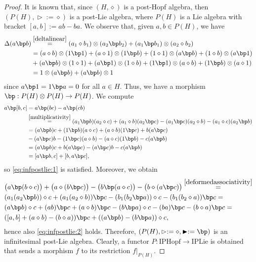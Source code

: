 \documentclass[10pt]{article}
\theoremstyle{definition}
\newcommand{\wt}{\vartriangleright}
\newcommand{\bt}{\blacktriangleright}
\renewcommand{\wp}{\diamond}
\newcommand{\ot}{\otimes}
\begin{document}
\begin{proof}
    It is known that, since $(H,\wp)$ is a post-Hopf algebra, then $(P(H),\wt:=\wp)$ is a post-Lie algebra, where $P(H)$ is a Lie algebra with bracket $[a,b]:=ab-ba$. We observe that, given $a,b\in P(H)$, we have
\[
\begin{split}
\Delta(a\bp b)&\overset{\eqref{deltalinear}}{=}(a_{1}\wp b_{1})\ot(a_{2}\bp b_{2})+(a_{1}\bp b_{1})\ot(a_{2}\wp b_{2})\\&=(a\wp b)\ot(1\bp1)+(a\wp1)\ot(1\bp b)+(1\wp1)\ot(a\bp b)+(1\wp b)\ot(a\bp1)\\&+(a\bp b)\ot(1\wp1)+(a\bp1)\ot(1\wp b)+(1\bp1)\ot(a\wp b)+(1\bp b)\ot(a\wp1)\\&=1\ot(a\bp b)+(a\bp b)\ot1
\end{split}
\]
since $a\bp1=1\bp a=0$ for all $a\in H$. Thus, we have a morphism $\bp:P(H)\ot P(H)\to P(H)$. We compute
\[
\begin{split}
a\bp[b,c]&=a\bp(bc)-a\bp(cb)\\&\overset{\eqref{multiplicativity}}{=}(a_{1}\bp b)(a_{2}\wp c)+(a_{1}\wp b)(a_{2}\bp c)-(a_{1}\bp c)(a_{2}\wp b)-(a_{1}\wp c)(a_{2}\bp b)\\&=(a\bp b)c+(1\bp b)(a\wp c)+(a\wp b)(1\bp c)+b(a\bp c)\\&-(a\bp c)b-(1\bp c)(a\wp b)-(a\wp c)(1\bp b)-c(a\bp b)\\&=(a\bp b)c+b(a\bp c)-(a\bp c)b-c(a\bp b) \\
&= [a \bp b,c] + [b, a \bp c],
\end{split}
\]
so \eqref{eq:infpostlie:1} is satisfied. Moreover, we obtain
\[
\begin{split}
&\big(a\bp(b\wp c)\big)+\big(a\wp(b\bp c)\big)-\big(b\bp(a\wp c)\big)-\big(b\wp(a\bp c)\big)\overset{\eqref{deformedassociativity}}{=}\\&(a_{1}(a_{2}\bp b))\wp c
+(a_{1}(a_{2}\wp b))\bp c -(b_{1}(b_{2}\bp a))\wp c-(b_{1}(b_{2}\wp a))\bp c= \\&(a\bp b)\wp c
+(ab)\bp c +(a\wp b)\bp c-(b\bp a)\wp c-(ba)\bp c -(b\wp a)\bp c=\\&([a,b]+(a\wp b)-(b\wp a))\bp c+((a\bp b)-(b\bp a))\wp c,
\end{split}
\]
hence also \eqref{eq:infpostlie:2} holds. Therefore, $(P(H),\wt:=\wp,\bt:=\bp)$ is an infinitesimal post-Lie algebra. Clearly, a functor $P:\mathrm{IPHopf}\to\mathrm{IPLie}$ is obtained that sends a morphism $f$ to its restriction $f|_{P(H)}$.
\end{proof}
\end{document}
